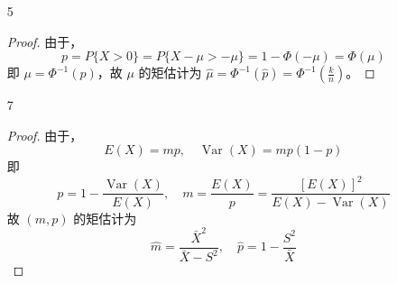 \documentclass[normal,founder,mtpro2,cn]{elegantnote}
\begin{document}
\begin{enumerate}
\begin{proof}
\begin{enumerate}
                      故 $(\theta,\mu)$ 的矩估计为
                      \begin{equation*}
                          \hat{\theta}=\sqrt{S^2},\quad\hat{\mu}=\bar{X}-\sqrt{S^2}
                      \end{equation*}
            \end{enumerate}
        \end{proof}
    \item[5]
        \begin{proof}
            由于，
            \begin{equation*}
                p=P\{X>0\}=P\{X-\mu>-\mu\}=1-\Phi(-\mu)=\Phi(\mu)
            \end{equation*}
            即 $\mu=\Phi^{-1}(p)$，故 $\mu$ 的矩估计为 $\hat{\mu}=\Phi^{-1}(\hat{p})=\Phi^{-1}\left(\frac{k}{n}\right)$。
        \end{proof}
    \item[7]
        \begin{proof}
            由于，
            \begin{equation*}
                E(X)=mp,\quad\operatorname{Var}(X)=mp(1-p)
            \end{equation*}
            即
            \begin{equation*}
                p=1-\frac{\operatorname{Var}(X)}{E(X)},\quad m=\frac{E(X)}{p}=\frac{[E(X)]^{2}}{E(X)-\operatorname{Var}(X)}
            \end{equation*}
            故 $(m,p)$ 的矩估计为
            \begin{equation*}
                \hat{m}=\frac{\bar{X}^{2}}{\bar{X}-S^{2}},\quad\hat{p}=1-\frac{S^{2}}{\bar{X}}
            \end{equation*}
        \end{proof}
\end{enumerate}
\end{document}
